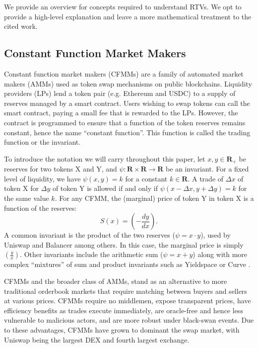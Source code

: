 \documentclass[hidelinks, 12pt]{article}
\begin{document}
We provide an overview for concepts required to understand RTVs. We opt to provide a high-level explanation and leave a more mathematical treatment to the cited work.

\subsection{Constant Function Market Makers}

Constant function market makers (CFMMs) are a family of automated market makers (AMMs) used as token swap mechanisms on public blockchains. Liquidity providers (LPs) lend a token pair (e.g. Ethereum and USDC) to a supply of reserves managed by a smart contract. Users wishing to swap tokens can call the smart contract, paying a small fee that is rewarded to the LPs. However, the contract is programmed to ensure that a function of the token reserves remains constant, hence the name ``constant function''. This function is called the trading function or the invariant.

To introduce the notation we will carry throughout this paper, let $x, y \in \mathbf{R}_+$ be reserves for two tokens X and Y, and $\psi: \mathbf{R} \times \mathbf{R} \rightarrow \mathbf{R}$ be an invariant. For a fixed level of liquidity, we have $\psi(x, y) = k$ for a constant $k \in \mathbf{R}$. A trade of $\Delta x$ of token X for $\Delta y$ of token Y is allowed if and only if $\psi(x - \Delta x, y + \Delta y) = k$ for the same value $k$. For any CFMM, the (marginal) price of token Y in token X is a function of the reserves:
\[S(x) = \left(-\frac{dy}{dx}\right).\]
A common invariant is the product of the two reserves ($\psi = x\cdot y$), used by Uniswap \cite{angeris2019analysis,adams2021uniswap} and Balancer \cite{martinelli2019non} among others.
In this case, the marginal price is simply $\left(\frac{y}{x}\right)$.
Other invariants include the arithmetic sum ($\psi = x + y$) along with more complex ``mixtures'' of sum and product invariants such as Yieldspace \cite{niemerg2020yieldspace} or Curve \cite{egorov2021automatic}.

CFMMs and the broader class of AMMs, stand as an alternative to more traditional orderbook markets that require matching between buyers and sellers at various prices. CFMMs require no middlemen, expose transparent prices, have efficiency benefits as trades execute immediately, are oracle-free and hence less vulnerable to malicious actors, and are more robust under black-swan events. Due to these advantages, CFMMs have grown to dominant the swap market, with Uniswap being the largest DEX and fourth largest exchange.
\end{document}
